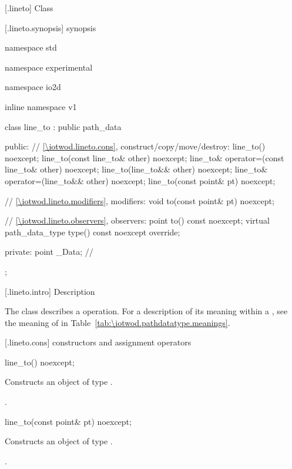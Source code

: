  [\iotwod.lineto] {Class }

 [\iotwod.lineto.synopsis] { synopsis}

\begin{codeblock}
namespace std { namespace experimental { namespace io2d { inline namespace v1 {
  class line_to : public path_data {
  public:
    // \ref{\iotwod.lineto.cons}, construct/copy/move/destroy:
    line_to() noexcept;
    line_to(const line_to& other) noexcept;
    line_to& operator=(const line_to& other) noexcept;
    line_to(line_to&& other) noexcept;
    line_to& operator=(line_to&& other) noexcept;
    line_to(const point& pt) noexcept;

    // \ref{\iotwod.lineto.modifiers}, modifiers:
    void to(const point& pt) noexcept;

    // \ref{\iotwod.lineto.observers}, observers:
    point to() const noexcept;
    virtual path_data_type type() const noexcept override;
    
  private:
    point _Data; // \expos
  };
} } } }
\end{codeblock}

 [\iotwod.lineto.intro] { Description}

\pnum
{}
The class  describes a  operation. For a description of its meaning within a , see the meaning of  in Table~\ref{tab:\iotwod.pathdatatype.meanings}.

 [\iotwod.lineto.cons] { constructors and assignment operators}

\begin{itemdecl}
    line_to() noexcept;
\end{itemdecl}
\begin{itemdescr}
	\pnum
	\effects
	Constructs an object of type .
	
	\pnum
	\postconditions
	.
\end{itemdescr}

\begin{itemdecl}
    line_to(const point& pt) noexcept;
\end{itemdecl}
\begin{itemdescr}
	\pnum
	\effects
	Constructs an object of type .
	
	\pnum
	\postconditions
	.
\end{itemdescr}

